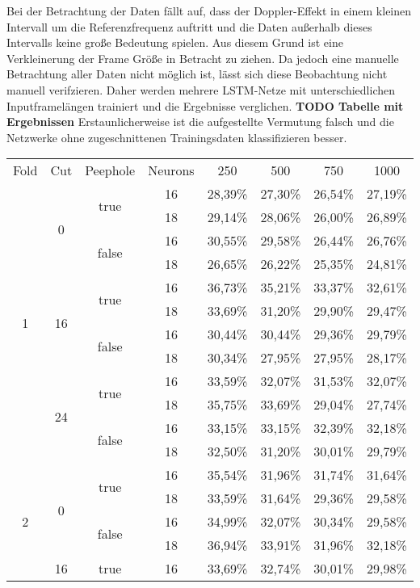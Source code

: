 Bei der Betrachtung der Daten fällt auf, dass der Doppler-Effekt in einem
kleinen Intervall um die Referenzfrequenz auftritt und die Daten außerhalb
dieses Intervalls keine große Bedeutung spielen. Aus diesem Grund ist eine
Verkleinerung der Frame Größe in Betracht zu ziehen. Da jedoch eine manuelle
Betrachtung aller Daten nicht möglich ist, lässt sich diese Beobachtung nicht
manuell verifzieren. Daher werden mehrere \ac{LSTM}-Netze mit unterschiedlichen
Inputframelängen trainiert und die Ergebnisse verglichen. \textbf{TODO Tabelle
mit Ergebnissen} Erstaunlicherweise ist die aufgestellte Vermutung falsch und die
Netzwerke ohne zugeschnittenen Trainingsdaten klassifizieren besser. 
\begin{table*}
\centering
\begin{tabular}{|c|c|c|c|c|c|c|c|}
\hline
 Fold 		& Cut & Peephole & Neurons & 250 & 500 & 750 & 1000 \\
 \multirow{12}{*}{1}&\multirow{4}{*}{0}&\multirow{2}{*}{true}&16&28,39\%&27,30\%&26,54\%&27,19\%\\
  & & &18&29,14\%&28,06\%&26,00\%&26,89\%\\
  & &\multirow{2}{*}{false}&16&30,55\%&29,58\%&26,44\%&26,76\%\\
  & & &18&26,65\%&26,22\%&25,35\%&24,81\%\\
  &\multirow{4}{*}{16}&\multirow{2}{*}{true}&16&36,73\%&35,21\%&33,37\%&32,61\%\\
  & & &18&33,69\%&31,20\%&29,90\%&29,47\%\\
  & &\multirow{2}{*}{false}&16&30,44\%&30,44\%&29,36\%&29,79\%\\
  & & &18&30,34\%&27,95\%&27,95\%&28,17\%\\
  &\multirow{4}{*}{24}&\multirow{2}{*}{true}&16&33,59\%&32,07\%&31,53\%&32,07\%\\
  & & &18&35,75\%&33,69\%&29,04\%&27,74\%\\
  & &\multirow{2}{*}{false}&16&33,15\%&33,15\%&32,39\%&32,18\%\\
  & & &18&32,50\%&31,20\%&30,01\%&29,79\%\\
  \multirow{12}{*}{2}&\multirow{4}{*}{0}&\multirow{2}{*}{true}&16&35,54\%&31,96\%&31,74\%&31,64\%\\
  & & &18&33,59\%&31,64\%&29,36\%&29,58\%\\
  & &\multirow{2}{*}{false}&16&34,99\%&32,07\%&30,34\%&29,58\%\\
  & & &18&36,94\%&33,91\%&31,96\%&32,18\%\\
  &\multirow{4}{*}{16}&\multirow{2}{*}{true}&16&33,69\%&32,74\%&30,01\%&29,98\%\\

\end{tabular}
\end{table*}
